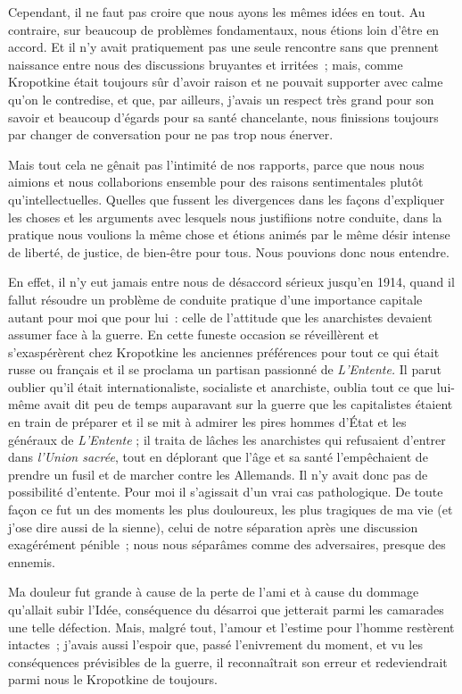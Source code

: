 \documentclass[french,twoside]{book} %
\begin{document}
Cependant, il ne faut pas croire que nous ayons les mêmes idées en tout. Au contraire, sur beaucoup de problèmes fondamentaux, nous étions loin d’être en accord. Et il n’y avait pratiquement pas une seule rencontre sans que prennent naissance entre nous des discussions bruyantes et irritées ; mais, comme Kropotkine était toujours sûr d’avoir raison et ne pouvait supporter avec calme qu’on le contredise, et que, par ailleurs, j’avais un respect très grand pour son savoir et beaucoup d’égards pour sa santé chancelante, nous finissions toujours par changer de conversation pour ne pas trop nous énerver.\par
Mais tout cela ne gênait pas l’intimité de nos rapports, parce que nous nous aimions et nous collaborions ensemble pour des raisons sentimentales plutôt qu’intellectuelles. Quelles que fussent les divergences dans les façons d’expliquer les choses et les arguments avec lesquels nous justifiions notre conduite, dans la pratique nous voulions la même chose et étions animés par le même désir intense de liberté, de justice, de bien-être pour tous. Nous pouvions donc nous entendre.\par
En effet, il n’y eut jamais entre nous de désaccord sérieux jusqu’en 1914, quand il fallut résoudre un problème de conduite pratique d’une importance capitale autant pour moi que pour lui : celle de l’attitude que les anarchistes devaient assumer face à la guerre. En cette funeste occasion se réveillèrent et s’exaspérèrent chez Kropotkine les anciennes préférences pour tout ce qui était russe ou français et il se proclama un partisan passionné de \emph{L'Entente.} Il parut oublier qu’il était internationaliste, socialiste et anarchiste, oublia tout ce que lui-même avait dit peu de temps auparavant sur la guerre que les capitalistes étaient en train de préparer et il se mit à admirer les pires hommes d’État et les généraux de \emph{L'Entente} ; il traita de lâches les anarchistes qui refusaient d’entrer dans \emph{l’Union sacrée}, tout en déplorant que l’âge et sa santé l’empêchaient de prendre un fusil et de marcher contre les Allemands. Il n’y avait donc pas de possibilité d’entente. Pour moi il s’agissait d’un vrai cas pathologique. De toute façon ce fut un des moments les plus douloureux, les plus tragiques de ma vie (et j’ose dire aussi de la sienne), celui de notre séparation après une discussion exagérément pénible ; nous nous séparâmes comme des adversaires, presque des ennemis.\par
Ma douleur fut grande à cause de la perte de l’ami et à cause du dommage qu’allait subir l’Idée, conséquence du désarroi que jetterait parmi les camarades une telle défection. Mais, malgré tout, l’amour et l’estime pour l’homme restèrent intactes ; j’avais aussi l’espoir que, passé l’enivrement du moment, et vu les conséquences prévisibles de la guerre, il reconnaîtrait son erreur et redeviendrait parmi nous le Kropotkine de toujours.\par
\end{document}
